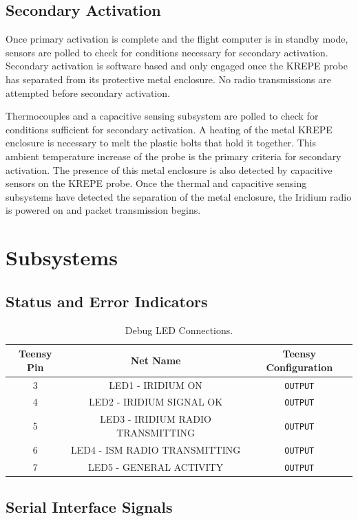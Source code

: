 \documentclass{article}
\begin{document}
\subsection{Secondary Activation}
Once primary activation is complete and the flight computer is in standby mode, sensors are polled to check for conditions necessary for secondary activation. Secondary activation is software based and only engaged once the KREPE probe has separated from its protective metal enclosure. No radio transmissions are attempted before secondary activation. 

Thermocouples and a capacitive sensing subsystem are polled to check for conditions sufficient for secondary activation. A heating of the metal KREPE enclosure is necessary to melt the plastic bolts that hold it together. This ambient temperature increase of the probe is the primary criteria for secondary activation. The presence of this metal enclosure is also detected by capacitive sensors on the KREPE probe. Once the thermal and capacitive sensing subsystems have detected the separation of the metal enclosure, the Iridium radio is powered on and packet transmission begins.  

\section{Subsystems}

\subsection{Status and Error Indicators}
\begin{table}[H]
    \centering
    \begin{tabular}{c|c|c}
    Teensy Pin & Net Name     & Teensy Configuration \\
    \hline 
    3 & LED1 - IRIDIUM ON        &   \texttt{OUTPUT}\\
    4 & LED2 - IRIDIUM SIGNAL OK       &   \texttt{OUTPUT}\\
    5 & LED3 - IRIDIUM RADIO TRANSMITTING       &   \texttt{OUTPUT}\\
    6 & LED4 - ISM RADIO TRANSMITTING       &   \texttt{OUTPUT}\\
    7 & LED5 - GENERAL ACTIVITY       &   \texttt{OUTPUT}
    \end{tabular}
    \caption{Debug LED Connections.}
    \label{tab:pins_leds}
\end{table}

\subsection{Serial Interface Signals}
\end{document}
